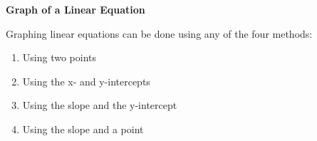 \begin{center}
\textbf{Graph of a Linear Equation
}
\end{center}

\vspce

Graphing linear equations can be done using any of the four methods: 
\begin{enumerate}[label = \arabic*. ]
\item \hspce Using two points
\vspce 
\item \hspce Using the x- and  y-intercepts
\vspce 
\item \hspce Using the slope  and the  y-intercept
\vspce 
\item \hspce Using the slope  and a point
 
\end{enumerate}  





